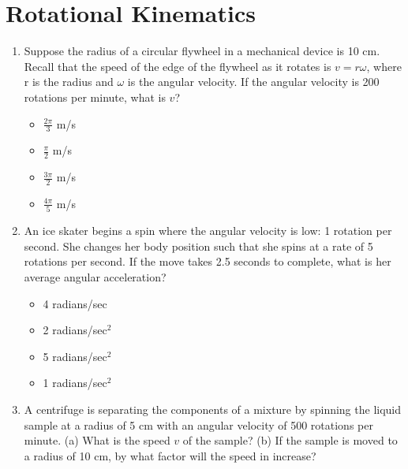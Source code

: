 \documentclass[10pt]{article}
\begin{document}
\maketitle

\section{Rotational Kinematics}
\begin{enumerate}
\item Suppose the radius of a circular flywheel in a mechanical device is 10 cm.  Recall that the speed of the edge of the flywheel as it rotates is $v = r\omega$, where r is the radius and $\omega$ is the angular velocity.  If the angular velocity is 200 rotations per minute, what is $v$?
\begin{itemize}
\item $\frac{2\pi}{3}$ m/s
\item $\frac{\pi}{2}$ m/s
\item $\frac{3\pi}{2}$ m/s
\item $\frac{4\pi}{5}$ m/s
\end{itemize}
\item An ice skater begins a spin where the angular velocity is low: 1 rotation per second.  She changes her body position such that she spins at a rate of 5 rotations per second.  If the move takes 2.5 seconds to complete, what is her average angular acceleration?
\begin{itemize}
\item 4 radians/sec
\item 2 radians/sec$^2$
\item 5 radians/sec$^2$
\item 1 radians/sec$^2$
\end{itemize}
\item A centrifuge is separating the components of a mixture by spinning the liquid sample at a radius of 5 cm with an angular velocity of 500 rotations per minute.  (a) What is the speed $v$ of the sample?  (b) If the sample is moved to a radius of 10 cm, by what factor will the speed in increase? \\ \vspace{1.5cm}
\end{enumerate}
\end{document}
